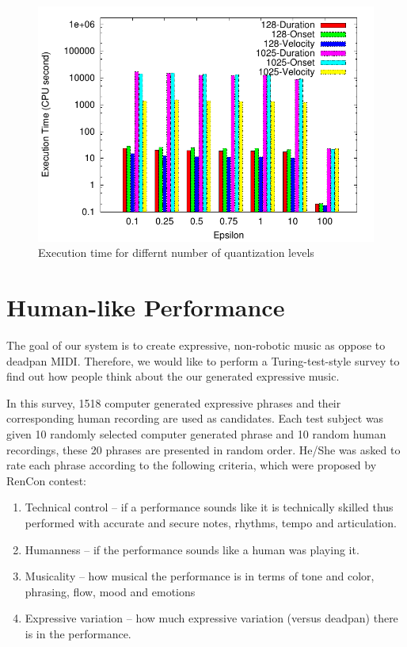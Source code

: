 \begin{figure}[tp]
   \begin{center}
      \includegraphics[width=\textwidth]{fig/quant_comp}
   \end{center}
   \caption{Execution time for differnt number of quantization levels}
   \label{fig:quant_comp}
\end{figure}

\section{Human-like Performance}
\label{sec:turing}
The goal of our system is to create expressive, non-robotic music as oppose to deadpan MIDI. Therefore, we would like to perform a Turing-test-style survey to find out how people think about the our generated expressive music.

In this survey, 1518 computer generated expressive phrases and their corresponding human recording are used as candidates. Each test subject was given 10 randomly selected computer generated phrase and 10 random human recordings, these 20 phrases are presented in random order. He/She was asked to rate each phrase according to the following criteria, which were proposed by RenCon contest\cite{rencon}:
\begin{enumerate}
   \item Technical control – if a performance sounds like it is technically skilled thus performed with accurate and secure notes, rhythms, tempo and articulation.
   \item  Humanness – if the performance sounds like a human was playing it.
   \item  Musicality – how musical the performance is in terms of tone and color, phrasing, flow, mood and emotions
   \item Expressive variation – how much expressive variation (versus deadpan) there is in the performance.
\end{enumerate}


